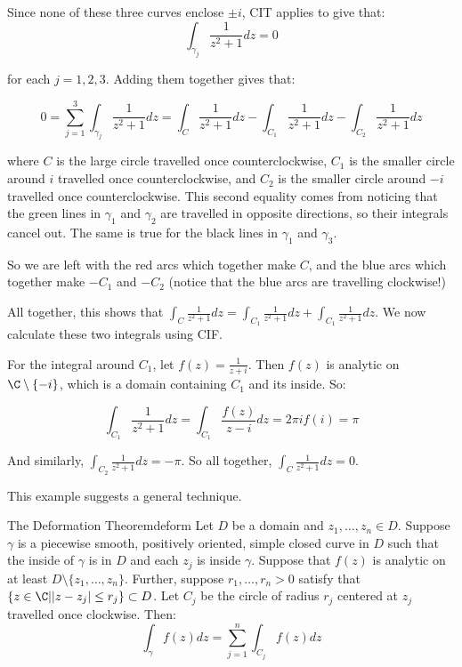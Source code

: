 \begin{ex}{}{}
Since none of these three curves enclose $\pm i$, CIT applies to give that:
$$\int_{\gamma_j} \frac{1}{z^2+1}dz = 0$$

\noin for each $j = 1,2,3$. Adding them together gives that:

$$0 = \sum_{j=1}^3 \int_{\gamma_j} \frac{1}{z^2+1}dz = \int_{C} \frac{1}{z^2+1}dz - \int_{C_1} \frac{1}{z^2+1}dz - \int_{C_2} \frac{1}{z^2+1}dz $$

\noin where $C$ is the large circle travelled once counterclockwise, $C_1$ is the smaller circle around $i$ travelled once counterclockwise, and $C_2$ is the smaller circle around $-i$ travelled once counterclockwise. This second equality comes from noticing that the green lines in $\gamma_1$ and $\gamma_2$ are travelled in opposite directions, so their integrals cancel out. The same is true for the black lines in $\gamma_1$ and $\gamma_3$.

So we are left with the red arcs which together make $C$, and the blue arcs which together make $-C_1$ and $-C_2$ (notice that the blue arcs are travelling clockwise!)

All together, this shows that $\int_{C}\frac{1}{z^2 + 1}dz = \int_{C_1}\frac{1}{z^2 + 1}dz + \int_{C_1}\frac{1}{z^2 + 1}dz$. We now calculate these two integrals using CIF.

For the integral around $C_1$, let $f(z) = \frac{1}{z+i}$. Then $f(z)$ is analytic on $\C\setminus\{-i\}$, which is a domain containing $C_1$ and its inside. So:

$$\int_{C_1} \frac{1}{z^2+1} dz = \int_{C_1}\frac{f(z)}{z-i}dz = 2\pi i f(i) = \pi$$

And similarly, $\int_{C_2}\frac{1}{z^2 + 1}dz = -\pi$. So all together, $\int_C \frac{1}{z^2+1}dz = 0$.
\end{ex}

This example suggests a general technique.

\begin{thmbo}{The Deformation Theorem}{deform} Let $D$ be a domain and $z_1,\dots,z_n \in D$. Suppose $\gamma$ is a piecewise smooth, positively oriented, simple closed curve in $D$ such that the inside of $\gamma$ is in $D$ and each $z_j$ is inside $\gamma$. Suppose that $f(z)$ is analytic on at least $D\setminus\{z_1,\dots,z_n\}$. Further, suppose $r_1,\dots,r_n > 0$ satisfy that $\{z\in\C||z-z_j| \le r_j\}\subset D$. Let $C_j$ be the circle of radius $r_j$ centered at $z_j$ travelled once clockwise. Then:
$$\int_{\gamma} f(z)dz = \sum_{j=1}^n \int_{C_j} f(z)dz$$
\end{thmbo}

